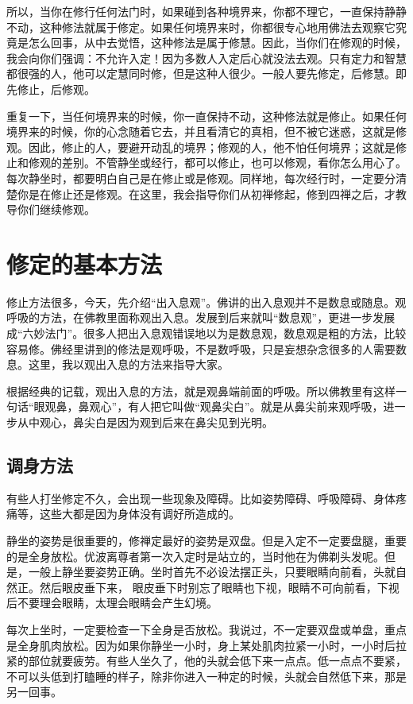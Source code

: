 \documentclass{book}
\begin{document}
所以，当你在修行任何法门时，如果碰到各种境界来，你都不理它，一直保持静静不动，这种修法就属于修定。如果任何境界来时，你都很专心地用佛法去观察它究竟是怎么回事，从中去觉悟，这种修法是属于修慧。因此，当你们在修观的时候，我会向你们强调：不允许入定！因为多数人入定后心就没法去观。只有定力和智慧都很强的人，他可以定慧同时修，但是这种人很少。一般人要先修定，后修慧。即先修止，后修观。

重复一下，当任何境界来的时候，你一直保持不动，这种修法就是修止。如果任何境界来的时候，你的心念随着它去，并且看清它的真相，但不被它迷惑，这就是修观。因此，修止的人，要避开动乱的境界；修观的人，他不怕任何境界；这就是修止和修观的差别。不管静坐或经行，都可以修止，也可以修观，看你怎么用心了。每次静坐时，都要明白自己是在修止或是修观。同样地，每次经行时，一定要分清楚你是在修止还是修观。在这里，我会指导你们从初禅修起，修到四禅之后，才教导你们继续修观。

\section{修定的基本方法}

修止方法很多，今天，先介绍``出入息观''。佛讲的出入息观并不是数息或随息。观呼吸的方法，在佛教里面称观出入息。发展到后来就叫``数息观''，更进一步发展成``六妙法门''。很多人把出入息观错误地以为是数息观，数息观是粗的方法，比较容易修。佛经里讲到的修法是观呼吸，不是数呼吸，只是妄想杂念很多的人需要数息。这里，我以观出入息的方法来指导大家。

根据经典的记载，观出入息的方法，就是观鼻端前面的呼吸。所以佛教里有这样一句话``眼观鼻，鼻观心''，有人把它叫做``观鼻尖白''。就是从鼻尖前来观呼吸，进一步从中观心，鼻尖白是因为观到后来在鼻尖见到光明。

\subsection{调身方法}

有些人打坐修定不久，会出现一些现象及障碍。比如姿势障碍、呼吸障碍、身体疼痛等，这些大都是因为身体没有调好所造成的。

静坐的姿势是很重要的，修禅定最好的姿势是双盘。但是入定不一定要盘腿，重要的是全身放松。优波离尊者第一次入定时是站立的，当时他在为佛剃头发呢。但是，一般上静坐要姿势正确。坐时首先不必设法摆正头，只要眼睛向前看，头就自然正。然后眼皮垂下来，
眼皮垂下时别忘了眼睛也下视，眼睛不可向前看，下视后不要理会眼睛，太理会眼睛会产生幻境。

每次上坐时，一定要检查一下全身是否放松。我说过，不一定要双盘或单盘，重点是全身肌肉放松。因为如果你静坐一小时，身上某处肌肉拉紧一小时，一小时后拉紧的部位就要疲劳。有些人坐久了，他的头就会低下来一点点。低一点点不要紧，不可以头低到打瞌睡的样子，除非你进入一种定的时候，头就会自然低下来，那是另一回事。
\end{document}
